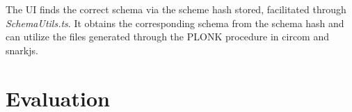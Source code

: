 The UI finds the correct schema via the scheme hash stored, facilitated through \textit{SchemaUtils.ts}. It obtains the corresponding schema from the schema hash and can utilize the files generated through the PLONK procedure in circom and snarkjs.

\section{Evaluation}

